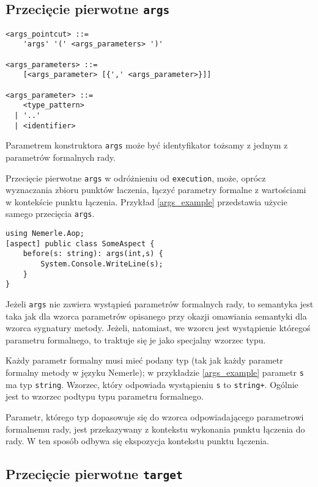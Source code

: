 \documentclass[a4paper,12pt]{mwbk}
\begin{document}
\subsection{Przecięcie pierwotne \lstinline!args!}\label{ppargs}

\begin{lstlisting}[style=grammar]
<args_pointcut> ::=
    'args' '(' <args_parameters> ')'

<args_parameters> ::=
    [<args_parameter> [{',' <args_parameter>}]]

<args_parameter> ::=
    <type_pattern>
  | '..'
  | <identifier>
\end{lstlisting}

Parametrem konstruktora \lstinline!args! może być identyfikator tożsamy z
jednym z parametrów formalnych rady.

Przecięcie pierwotne \lstinline!args! w odróżnieniu od \lstinline!execution!,
może, oprócz wyznaczania zbioru punktów łaczenia, łączyć parametry formalne z
wartościami w kontekście punktu łączenia. Przykład \ref{args_example}
przedstawia użycie samego przecięcia \lstinline!args!.

\begin{lstlisting}[style=AspectJ,caption=Args,label=args_example]
using Nemerle.Aop;
[aspect] public class SomeAspect {
    before(s: string): args(int,s) {
        System.Console.WriteLine(s);
    }
}
\end{lstlisting}

Jeżeli \lstinline!args! nie zawiera wystąpień parametrów formalnych rady, to
semantyka jest taka jak dla wzorca parametrów opisanego przy okazji omawiania
semantyki dla wzorca sygnatury metody.  Jeżeli, natomiast, we wzorcu jest
wystąpienie któregoś parametru formalnego, to traktuje się je jako specjalny
wzorzec typu. 

Każdy parametr formalny musi mieć podany typ (tak jak każdy
parametr formalny metody w języku Nemerle); w przykładzie \ref{args_example}
parametr \lstinline!s! ma typ \lstinline!string!.  Wzorzec, który odpowiada
wystąpieniu \lstinline!s! to \lstinline!string+!. Ogólnie jest to wzorzec
podtypu typu parametru formalnego.

Parametr, którego typ dopasowuje się do wzorca odpowiadającego parametrowi
formalnemu rady, jest przekazywany z kontekstu wykonania punktu łączenia do
rady. W ten sposób odbywa się ekspozycja kontekstu punktu łączenia.


\subsection{Przecięcie pierwotne \lstinline!target!}\label{pptarget}
\end{document}
